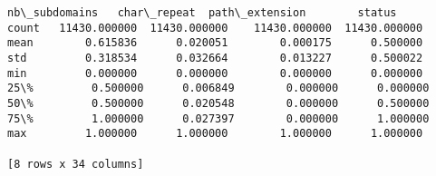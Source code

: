 \begin{tcolorbox}[breakable, size=fbox, boxrule=.5pt, pad at break*=1mm, opacityfill=0]
\begin{Verbatim}[commandchars=\\\{\}]
       nb\_subdomains   char\_repeat  path\_extension        status
count   11430.000000  11430.000000    11430.000000  11430.000000
mean        0.615836      0.020051        0.000175      0.500000
std         0.318534      0.032664        0.013227      0.500022
min         0.000000      0.000000        0.000000      0.000000
25\%         0.500000      0.006849        0.000000      0.000000
50\%         0.500000      0.020548        0.000000      0.500000
75\%         1.000000      0.027397        0.000000      1.000000
max         1.000000      1.000000        1.000000      1.000000

[8 rows x 34 columns]
\end{Verbatim}
\end{tcolorbox}
\newpage
